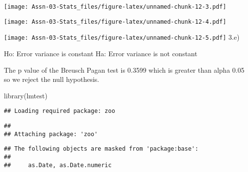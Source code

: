 \documentclass[
]{article}
\newenvironment{Shaded}{\begin{snugshade}}{\end{snugshade}}
\newcommand{\FunctionTok}[1]{\textcolor[rgb]{0.00,0.00,0.00}{#1}}
\newcommand{\NormalTok}[1]{#1}
\newcommand{\SpecialCharTok}[1]{\textcolor[rgb]{0.00,0.00,0.00}{#1}}
\begin{document}
\begin{Shaded}
\end{Shaded}

\texttt{[image: Assn-03-Stats\_files/figure-latex/unnamed-chunk-12-3.pdf]}

\begin{Shaded}
\end{Shaded}

\texttt{[image: Assn-03-Stats\_files/figure-latex/unnamed-chunk-12-4.pdf]}

\begin{Shaded}
\end{Shaded}

\texttt{[image: Assn-03-Stats\_files/figure-latex/unnamed-chunk-12-5.pdf]}
3.e)

Ho: Error variance is constant Ha: Error variance is not constant

The p value of the Breusch Pagan test is 0.3599 which is greater than
alpha 0.05 so we reject the null hypothesis.

\begin{Shaded}
\begin{Highlighting}[]
\FunctionTok{library}\NormalTok{(lmtest)}
\end{Highlighting}
\end{Shaded}

\begin{verbatim}
## Loading required package: zoo
\end{verbatim}

\begin{verbatim}
## 
## Attaching package: 'zoo'
\end{verbatim}

\begin{verbatim}
## The following objects are masked from 'package:base':
## 
##     as.Date, as.Date.numeric
\end{verbatim}
\end{document}

